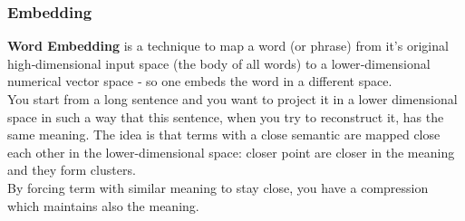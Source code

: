 \subsubsection{Embedding}
\textbf{Word Embedding} is a technique to map a word (or phrase) from it's original high‐dimensional input space (the body of all words) to a lower‐dimensional numerical vector space ‐ so one embeds the word in a different space. \\ 

You start from a long sentence and you want to project it in a lower dimensional space in such a way that this sentence, when you try to reconstruct it, has the same meaning. The idea is that terms with a close semantic are mapped close each other in the lower-dimensional space: closer point are closer in the meaning and they form clusters. \\
By forcing term with similar meaning to stay close, you have a compression which maintains also the meaning. \\


